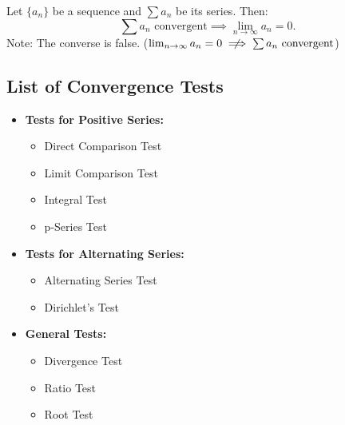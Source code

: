 \documentclass[a4paper,11pt]{article}
\theoremstyle{definition}
\theoremstyle{plain}
\theoremstyle{remark}
\begin{document}
\begin{tcolorbox}
    Let $\{a_n\}$ be a sequence and $\textstyle \sum a_n$ be its series. Then:
    \[
    \sum a_n \text{ convergent} \implies \lim_{n \to \infty} a_n = 0.
    \]
    Note: The converse is false. ($\textstyle \lim_{n \to \infty} a_n = 0 \centernot\implies \sum a_n \text{ convergent}$)
\end{tcolorbox}




\subsection{List of Convergence Tests}

\begin{tcolorbox}
    \begin{itemize}
        \item \textbf{Tests for Positive Series:}
        \begin{multicols}{2}
            \begin{itemize}[label=$\circ$]
                \item Direct Comparison Test
                \item Limit Comparison Test
                \item Integral Test %
                \item p-Series Test
            \end{itemize}
        \end{multicols}
        \item \textbf{Tests for Alternating Series:}
        \begin{multicols}{2}
            \begin{itemize}[label=$\circ$]
                \item Alternating Series Test %
                \item Dirichlet’s Test
            \end{itemize}
        \end{multicols}
        \item \textbf{General Tests:}
        \begin{multicols}{2}
            \begin{itemize}[label=$\circ$]
                \item Divergence Test %
                \item Ratio Test %
                \item Root Test %

\end{itemize}
\end{multicols}
\end{itemize}
\end{tcolorbox}
\end{document}
